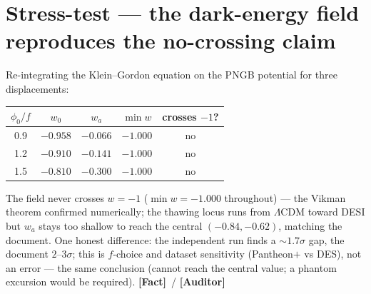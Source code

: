 \documentclass[11pt]{article}
\newcommand{\Fact}{\textbf{\textcolor{green!45!black}{[Fact]}}}
\newcommand{\Auditor}{\textbf{\textcolor{teal!55!black}{[Auditor]}}}
\begin{document}
\section{Stress-test --- the dark-energy field reproduces the no-crossing claim}
Re-integrating the Klein--Gordon equation on the PNGB potential for three displacements:
\begin{center}\small
\begin{tabular}{@{}ccccc@{}}
\toprule
$\phi_0/f$ & $w_0$ & $w_a$ & $\min w$ & crosses $-1$? \\
\midrule
0.9 & $-0.958$ & $-0.066$ & $-1.000$ & no \\
1.2 & $-0.910$ & $-0.141$ & $-1.000$ & no \\
1.5 & $-0.810$ & $-0.300$ & $-1.000$ & no \\
\bottomrule
\end{tabular}
\end{center}
The field never crosses $w=-1$ ($\min w=-1.000$ throughout) --- the Vikman theorem confirmed numerically; the thawing locus runs from $\Lambda$CDM toward DESI but $w_a$ stays too shallow to reach the central $(-0.84,-0.62)$, matching the document. One honest difference: the independent run finds a $\sim1.7\sigma$ gap, the document $2$--$3\sigma$; this is $f$-choice and dataset sensitivity (Pantheon$+$ vs DES), not an error --- the same conclusion (cannot reach the central value; a phantom excursion would be required). \Fact\ / \Auditor
\end{document}
